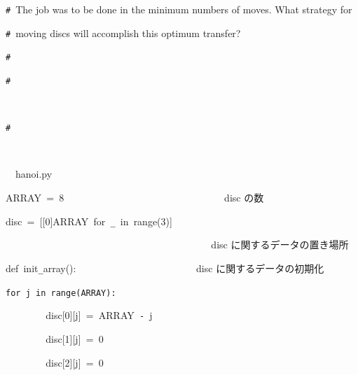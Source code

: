 \documentclass{article}
\begin{document}
\noindent
\mbox{}{\tt\#}\  {}\hspace{\leftmargini}The job was to be done in the minimum numbers of moves. What strategy for  \rm\mc 

\noindent
\mbox{}{\tt\#}\  {}\hspace{\leftmargini}moving discs will accomplish this optimum transfer?  \rm\mc 

\noindent
\mbox{}{\tt\#}\  {}  \rm\mc 

\noindent
\mbox{}{\tt\#}
\tt\mc 

\noindent
\mbox{}\rm\mc {\tt\#}\  {}%

\noindent
\mbox{}{\tt\#}
\tt\mc 

\noindent
\mbox{}\rm\mc {\tt\#}\  \hrulefill  \rm\mc 

\noindent
\mbox{}\tt\mc \hfill

\noindent
\mbox{}\hfill

\noindent
\mbox{}\rm\mc {\tt\#}\  \hrulefill\ hanoi.py \ \hrulefill \rm\mc 

\noindent
\mbox{}\tt\mc \hfill

\noindent
\mbox{}\hfill

\noindent
\mbox{}ARRAY{\tt\mc \ }={\tt\mc \ }8{\tt\mc \ \ \ \ \ \ \ \ \ \ \ \ \ \ \ \ \ \ \ \ \ \ \ \ \ \ \ \ \ \ \ }\rm\mc {\tt\#}\  {}disc の数 \hfill  \rm\mc 

\noindent
\mbox{}\tt\mc \hfill

\noindent
\mbox{}disc{\tt\mc \ }={\tt\mc \ }[[0]{\tt *}ARRAY{\tt\mc \ }for{\tt\mc \ }{\tt\_}{\tt\mc \ }in{\tt\mc \ }range(3)]

\noindent
\mbox{}{\tt\mc \ \ \ \ \ \ \ \ \ \ \ \ \ \ \ \ \ \ \ \ \ \ \ \ \ \ \ \ \ \ \ \ \ \ \ \ \ \ \ \ }\rm\mc {\tt\#}\  {}disc に関するデータの置き場所 \hfill  \rm\mc 

\noindent
\mbox{}\tt\mc \hfill

\noindent
\mbox{}def{\tt\mc \ }init{\tt\_}array():{\tt\mc \ \ \ \ \ \ \ \ \ \ \ \ \ \ \ \ \ \ \ \ \ \ \ }\rm\mc {\tt\#}\  {}disc に関するデータの初期化 \hfill  \rm\mc 

\noindent
\mbox{}\tt\mc {\tt\mc \ \ \ \ }for{\tt\mc \ }j{\tt\mc \ }in{\tt\mc \ }range(ARRAY):

\noindent
\mbox{}{\tt\mc \ \ \ \ \ \ \ \ }disc[0][j]{\tt\mc \ }={\tt\mc \ }ARRAY{\tt\mc \ }{\tt -}{\tt\mc \ }j

\noindent
\mbox{}{\tt\mc \ \ \ \ \ \ \ \ }disc[1][j]{\tt\mc \ }={\tt\mc \ }0

\noindent
\mbox{}{\tt\mc \ \ \ \ \ \ \ \ }disc[2][j]{\tt\mc \ }={\tt\mc \ }0
\end{document}
